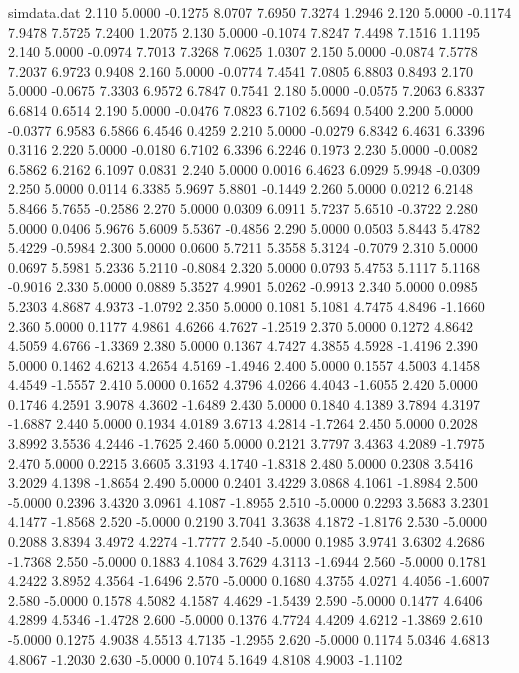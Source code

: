 \begin{filecontents*}{simdata.dat}
2.110 5.0000 -0.1275 8.0707 7.6950 7.3274 1.2946
2.120 5.0000 -0.1174 7.9478 7.5725 7.2400 1.2075
2.130 5.0000 -0.1074 7.8247 7.4498 7.1516 1.1195
2.140 5.0000 -0.0974 7.7013 7.3268 7.0625 1.0307
2.150 5.0000 -0.0874 7.5778 7.2037 6.9723 0.9408
2.160 5.0000 -0.0774 7.4541 7.0805 6.8803 0.8493
2.170 5.0000 -0.0675 7.3303 6.9572 6.7847 0.7541
2.180 5.0000 -0.0575 7.2063 6.8337 6.6814 0.6514
2.190 5.0000 -0.0476 7.0823 6.7102 6.5694 0.5400
2.200 5.0000 -0.0377 6.9583 6.5866 6.4546 0.4259
2.210 5.0000 -0.0279 6.8342 6.4631 6.3396 0.3116
2.220 5.0000 -0.0180 6.7102 6.3396 6.2246 0.1973
2.230 5.0000 -0.0082 6.5862 6.2162 6.1097 0.0831
2.240 5.0000 0.0016 6.4623 6.0929 5.9948 -0.0309
2.250 5.0000 0.0114 6.3385 5.9697 5.8801 -0.1449
2.260 5.0000 0.0212 6.2148 5.8466 5.7655 -0.2586
2.270 5.0000 0.0309 6.0911 5.7237 5.6510 -0.3722
2.280 5.0000 0.0406 5.9676 5.6009 5.5367 -0.4856
2.290 5.0000 0.0503 5.8443 5.4782 5.4229 -0.5984
2.300 5.0000 0.0600 5.7211 5.3558 5.3124 -0.7079
2.310 5.0000 0.0697 5.5981 5.2336 5.2110 -0.8084
2.320 5.0000 0.0793 5.4753 5.1117 5.1168 -0.9016
2.330 5.0000 0.0889 5.3527 4.9901 5.0262 -0.9913
2.340 5.0000 0.0985 5.2303 4.8687 4.9373 -1.0792
2.350 5.0000 0.1081 5.1081 4.7475 4.8496 -1.1660
2.360 5.0000 0.1177 4.9861 4.6266 4.7627 -1.2519
2.370 5.0000 0.1272 4.8642 4.5059 4.6766 -1.3369
2.380 5.0000 0.1367 4.7427 4.3855 4.5928 -1.4196
2.390 5.0000 0.1462 4.6213 4.2654 4.5169 -1.4946
2.400 5.0000 0.1557 4.5003 4.1458 4.4549 -1.5557
2.410 5.0000 0.1652 4.3796 4.0266 4.4043 -1.6055
2.420 5.0000 0.1746 4.2591 3.9078 4.3602 -1.6489
2.430 5.0000 0.1840 4.1389 3.7894 4.3197 -1.6887
2.440 5.0000 0.1934 4.0189 3.6713 4.2814 -1.7264
2.450 5.0000 0.2028 3.8992 3.5536 4.2446 -1.7625
2.460 5.0000 0.2121 3.7797 3.4363 4.2089 -1.7975
2.470 5.0000 0.2215 3.6605 3.3193 4.1740 -1.8318
2.480 5.0000 0.2308 3.5416 3.2029 4.1398 -1.8654
2.490 5.0000 0.2401 3.4229 3.0868 4.1061 -1.8984
2.500 -5.0000 0.2396 3.4320 3.0961 4.1087 -1.8955
2.510 -5.0000 0.2293 3.5683 3.2301 4.1477 -1.8568
2.520 -5.0000 0.2190 3.7041 3.3638 4.1872 -1.8176
2.530 -5.0000 0.2088 3.8394 3.4972 4.2274 -1.7777
2.540 -5.0000 0.1985 3.9741 3.6302 4.2686 -1.7368
2.550 -5.0000 0.1883 4.1084 3.7629 4.3113 -1.6944
2.560 -5.0000 0.1781 4.2422 3.8952 4.3564 -1.6496
2.570 -5.0000 0.1680 4.3755 4.0271 4.4056 -1.6007
2.580 -5.0000 0.1578 4.5082 4.1587 4.4629 -1.5439
2.590 -5.0000 0.1477 4.6406 4.2899 4.5346 -1.4728
2.600 -5.0000 0.1376 4.7724 4.4209 4.6212 -1.3869
2.610 -5.0000 0.1275 4.9038 4.5513 4.7135 -1.2955
2.620 -5.0000 0.1174 5.0346 4.6813 4.8067 -1.2030
2.630 -5.0000 0.1074 5.1649 4.8108 4.9003 -1.1102

\end{filecontents*}
